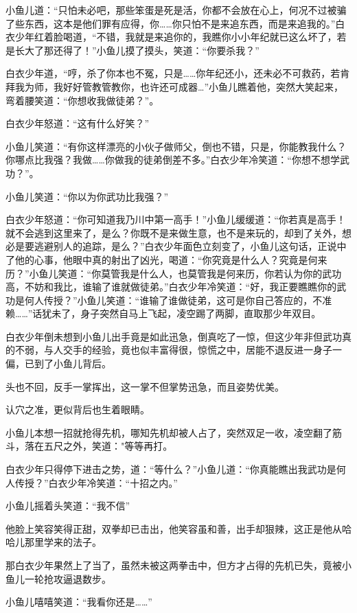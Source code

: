 \documentclass[12pt,oneside]{book}
\begin{document}
小鱼儿道：``只怕未必吧，那些笨蛋是死是活，你都不会放在心上，何况不过被骗了些东西，这本是他们罪有应得，你\ldots\ldots 你只怕不是来追东西，而是来追我的。''白衣少年红着脸喝道，``不错，我就是来追你的，我瞧你小小年纪就已这么坏了，若是长大了那还得了！''小鱼儿摸了摸头，笑道：``你要杀我？''

白衣少年道，``哼，杀了你本也不冤，只是\ldots\ldots 你年纪还小，还未必不可救药，若肯拜我为师，我好好管教管教你，也许还可成器\ldots{}''小鱼儿瞧着他，突然大笑起来，弯着腰笑道：``你想收我做徒弟？''。

白衣少年怒道：``这有什么好笑？''

小鱼儿笑道：``有你这样漂亮的小伙子做师父，倒也不错，只是，你能教我什么？你哪点比我强？我做\ldots\ldots 你做我的徒弟倒差不多。''白衣少年冷笑道：``你想不想学武功？''。

小鱼儿笑道：``你以为你武功比我强？''

白衣少年怒道：``你可知道我乃川中第一高手！''小鱼儿缓缓道：``你若真是高手！就不会逃到这里来了，是么？你既不是来做生意，也不是来玩的，却到了关外，想必是要逃避别人的追踪，是么？''白衣少年面色立刻变了，小鱼儿这句话，正说中了他的心事，他眼中真的射出了凶光，喝道：``你究竟是什么人？究竟是何来历？''小鱼儿笑道：``你莫管我是什么人，也莫管我是何来历，你若认为你的武功高，不妨和我比，谁输了谁就做徒弟。''白衣少年冷笑道：``好，我正要瞧瞧你的武功是何人传授？''小鱼儿笑道：``谁输了谁做徒弟，这可是你自己答应的，不准赖\ldots\ldots{}''话犹未了，身子突然自马上飞起，凌空踢了两脚，直取那少年双目。

白衣少年倒未想到小鱼儿出手竟是如此迅急，倒真吃了一惊，但这少年非但武功真的不弱，与人交手的经验，竟也似丰富得很，惊慌之中，居能不退反进一身子一偏，已到了小鱼儿背后。

头也不回，反手一掌挥出，这一掌不但掌势迅急，而且姿势优美。

认穴之准，更似背后也生着眼睛。

小鱼儿本想一招就抢得先机，哪知先机却被人占了，突然双足一收，凌空翻了筋斗，落在五尺之外，笑道："等等再打。

白衣少年只得停下进击之势，道：``等什么？''小鱼儿道：``你真能瞧出我武功是何人传授？''白衣少年冷笑道：``十招之内。''

小鱼儿摇着头笑道：``我不信''

他脸上笑容笑得正甜，双拳却已击出，他笑容虽和善，出手却狠辣，这正是他从哈哈儿那里学来的法子。

那白衣少年果然上了当了，虽然未被这两拳击中，但方才占得的先机已失，竟被小鱼儿一轮抢攻逼退数步。

小鱼儿嘻嘻笑道：``我看你还是\ldots\ldots{}''
\end{document}
